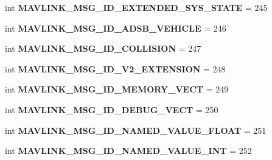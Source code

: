 \begin{DoxyCompactItemize}
int {\bfseries M\+A\+V\+L\+I\+N\+K\+\_\+\+M\+S\+G\+\_\+\+I\+D\+\_\+\+E\+X\+T\+E\+N\+D\+E\+D\+\_\+\+S\+Y\+S\+\_\+\+S\+T\+A\+TE} = 245
\item 
\mbox{\label{namespacepymavlink_1_1dialects_1_1v10_af92728fa0f9d5dbf9549d7221380e427}} 
int {\bfseries M\+A\+V\+L\+I\+N\+K\+\_\+\+M\+S\+G\+\_\+\+I\+D\+\_\+\+A\+D\+S\+B\+\_\+\+V\+E\+H\+I\+C\+LE} = 246
\item 
\mbox{\label{namespacepymavlink_1_1dialects_1_1v10_a9d96f3a66e050c8c409af5c6fbf2c07e}} 
int {\bfseries M\+A\+V\+L\+I\+N\+K\+\_\+\+M\+S\+G\+\_\+\+I\+D\+\_\+\+C\+O\+L\+L\+I\+S\+I\+ON} = 247
\item 
\mbox{\label{namespacepymavlink_1_1dialects_1_1v10_a223af130b85c16a8d5142d09ec9621eb}} 
int {\bfseries M\+A\+V\+L\+I\+N\+K\+\_\+\+M\+S\+G\+\_\+\+I\+D\+\_\+\+V2\+\_\+\+E\+X\+T\+E\+N\+S\+I\+ON} = 248
\item 
\mbox{\label{namespacepymavlink_1_1dialects_1_1v10_a4805163f696601f2c7eaf9c2431b781b}} 
int {\bfseries M\+A\+V\+L\+I\+N\+K\+\_\+\+M\+S\+G\+\_\+\+I\+D\+\_\+\+M\+E\+M\+O\+R\+Y\+\_\+\+V\+E\+CT} = 249
\item 
\mbox{\label{namespacepymavlink_1_1dialects_1_1v10_ab66f83bfc806e3944ecb020674169a2c}} 
int {\bfseries M\+A\+V\+L\+I\+N\+K\+\_\+\+M\+S\+G\+\_\+\+I\+D\+\_\+\+D\+E\+B\+U\+G\+\_\+\+V\+E\+CT} = 250
\item 
\mbox{\label{namespacepymavlink_1_1dialects_1_1v10_a5c01812460666d5477e4b4ffc39bc14a}} 
int {\bfseries M\+A\+V\+L\+I\+N\+K\+\_\+\+M\+S\+G\+\_\+\+I\+D\+\_\+\+N\+A\+M\+E\+D\+\_\+\+V\+A\+L\+U\+E\+\_\+\+F\+L\+O\+AT} = 251
\item 
\mbox{\label{namespacepymavlink_1_1dialects_1_1v10_a63d5eff017f2e15783bb0156076409e4}} 
int {\bfseries M\+A\+V\+L\+I\+N\+K\+\_\+\+M\+S\+G\+\_\+\+I\+D\+\_\+\+N\+A\+M\+E\+D\+\_\+\+V\+A\+L\+U\+E\+\_\+\+I\+NT} = 252
\item 
\mbox{\label{namespacepymavlink_1_1dialects_1_1v10_ac69c1a550bc78d4d7ba160a5a7bd5dc2}} 

\end{DoxyCompactItemize}
